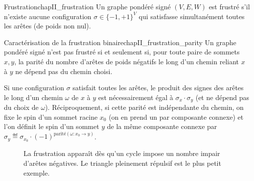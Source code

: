 \begin{Definition}{Frustration}{chapII_frustration}
Un graphe pondéré signé $(V,E,W)$ est frustré s'il n'existe aucune configuration $\sigma\in\{-1,+1\}^V$ qui satisfasse simultanément toutes les arêtes (de poids non nul).
\end{Definition}

\begin{Fait}{Caractérisation de la frustration binaire}{chapII_frustration_parity}
Un graphe pondéré signé n'est pas frustré si et seulement si, pour toute paire de sommets $x,y$, la parité du nombre d'arêtes de poids négatifs le long d'un chemin reliant $x$ à $y$ ne dépend pas du chemin choisi.
\end{Fait}

\begin{Preuve}
Si une configuration $\sigma$ satisfait toutes les arêtes, le produit des signes des arêtes le long d'un chemin $\omega$ de $x$ à $y$ est nécessairement égal à $\sigma_x \cdot \sigma_y$ (et ne dépend pas du choix de $\omega$). Réciproquement, si cette parité est indépendante du chemin, on fixe le spin d'un sommet racine $x_0$ (on en prend un par composante connexe) et l'on définit le spin d'un sommet $y$ de la même composante connexe par $\sigma_y \eqdef \sigma_{x_0} \cdot \left(-1\right)^{\mathrm{parité} (\omega : x_0 \to y)}$.
\end{Preuve}

\begin{figure}[H]
\centering
{}
\caption{La frustration apparaît dès qu'un cycle impose un nombre impair d'arêtes négatives. Le triangle pleinement répulsif est le plus petit exemple.}
\label{fig:chapII_frustration_triangle}
\end{figure}

